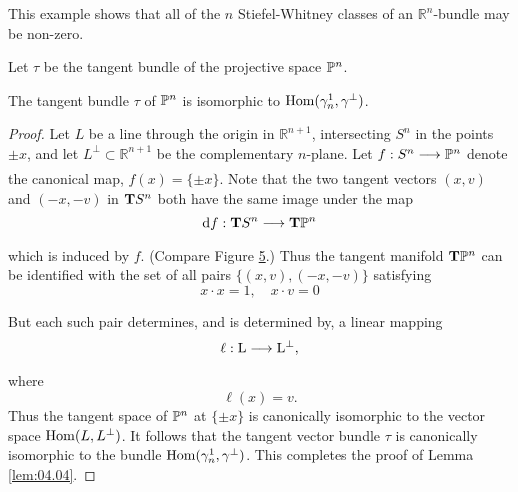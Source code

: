 \documentclass[../main]{subfiles}
\begin{document}
This example shows that all of the $n$ Stiefel-Whitney classes of an $\mathbb{R}^n$-bundle may be non-zero.

\begin{example}
\label{exa:04.04}
Let $\tau$ be the tangent bundle of the projective space $\mathbb{P}^{n}$.
\end{example}

\begin{lemma}
\label{lem:04.04}
The tangent bundle $\tau$ of $\mathbb{P}^{n}$ is isomorphic to $\operatorname{Hom}(\gamma_n^1, \gamma^{\perp})$.
\end{lemma}

\begin{proof}
Let $L$ be a line through the origin in $\mathbb{R}^{n+1}$, intersecting $S^{n}$ in the points $\pm x$, and let $L^{\perp} \subset \mathbb{R}^{n+1}$ be the complementary $n$-plane. Let $f: S^n \varrightarrow{} \projective^n$ denote the canonical map, $f(x)=\{\pm x\}$. Note that the two tangent vectors $(x, v)$ and $(-x,-v)$ in $\mathbf{T}S^{n}$ both have the same image under the map 
\[
\tangentbundlemap{f}: \tangentTS S^n \varrightarrow{} \tangentTS \projective^n
\]
which is induced by $f$. (Compare Figure \hyperref[fig:figure5]{5}.) Thus the tangent manifold $\mathbf{T}\mathbb{P}^n$ can be identified with the set of all pairs $\{(x, v),(-x,-v)\}$ satisfying
\[
x \cdot x=1, \quad x \cdot v=0
\]
\begin{figure}
\label{fig:figure5}
\centering
{}
\caption{}
\end{figure}
But each such pair determines, and is determined by, a linear mapping
\[
\ell: \mathrm{L} \varrightarrow{} \mathrm{L}^{\perp},
\]
where
\[
\ell(x)=v.
\]
Thus the tangent space of $\mathbb{P}^{n}$ at $\{\pm x\}$ is canonically isomorphic to the vector space $\operatorname{Hom}(L, L^{\perp})$. It follows that the tangent vector bundle $\tau$ is canonically isomorphic to the bundle $\operatorname{Hom}(\gamma_n^1, \gamma^{\perp})$. This completes the proof of Lemma \ref{lem:04.04}.

\end{proof}
\end{document}
